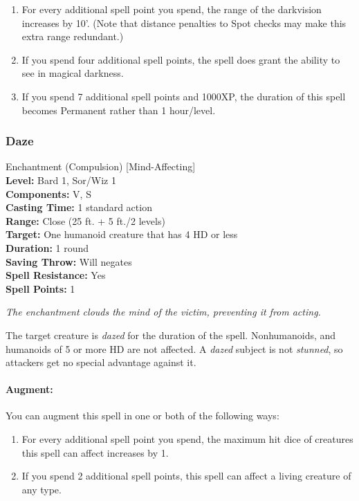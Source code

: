 \begin{enumerate}
 \item For every additional spell point you spend, the range of the darkvision increases by 10'.
(Note that distance penalties to Spot checks may make this extra range redundant.)
 \item If you spend four additional spell points, the spell does grant the ability to see in magical darkness.
 \item If you spend 7 additional spell points and 1000XP, the duration of this spell
  becomes Permanent rather than 1 hour/level.
\end{enumerate}
\subsubsection{Daze}
\label{Spell:Daze}
Enchantment (Compulsion) [Mind-Affecting]
\\ \textbf{Level:} Bard 1, Sor/Wiz 1
\\ \textbf{Components:} V, S
\\ \textbf{Casting Time:} 1 standard action
\\ \textbf{Range:} Close (25 ft. + 5 ft./2 levels)
\\ \textbf{Target:} One humanoid creature that has 4 HD or less
\\ \textbf{Duration:} 1 round
\\ \textbf{Saving Throw:} Will negates
\\ \textbf{Spell Resistance:} Yes
\\ \textbf{Spell Points:} 1

\emph{The enchantment clouds the mind of the victim, preventing it from acting.}

The target creature is \emph{dazed} for the duration of the spell.
Nonhumanoids, and humanoids of 5 or more HD are not affected. A \emph{dazed} subject is not \emph{stunned}, so attackers get no special advantage against it.

\paragraph{Augment:} You can augment this spell in one or both of the following ways:
\begin{enumerate}
\item For every additional spell point you spend, the maximum hit dice of creatures this spell can affect increases by 1.
\item If you spend 2 additional spell points, this spell can affect a living creature of any type.
\end{enumerate}
